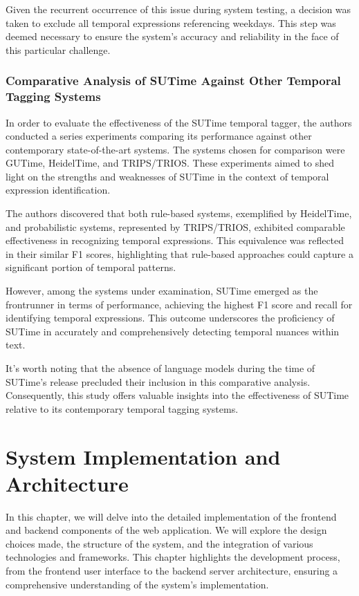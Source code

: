 \documentclass[a4paper,12pt]{report} %
\begin{document}
Given the recurrent occurrence of this issue during system testing, a decision was taken to exclude all temporal expressions referencing weekdays. This step was deemed necessary to ensure the system's accuracy and reliability in the face of this particular challenge.

\subsection{Comparative Analysis of SUTime Against Other Temporal Tagging Systems}
In order to evaluate the effectiveness of the SUTime temporal tagger, the authors conducted a series experiments comparing its performance against other contemporary state-of-the-art systems. The systems chosen for comparison were GUTime, HeidelTime, and TRIPS/TRIOS. These experiments aimed to shed light on the strengths and weaknesses of SUTime in the context of temporal expression identification.

The authors discovered that both rule-based systems, exemplified by HeidelTime, and probabilistic systems, represented by TRIPS/TRIOS, exhibited comparable effectiveness in recognizing temporal expressions. This equivalence was reflected in their similar F1 scores, highlighting that rule-based approaches could capture a significant portion of temporal patterns.

However, among the systems under examination, SUTime emerged as the frontrunner in terms of performance, achieving the highest F1 score and recall for identifying temporal expressions. This outcome underscores the proficiency of SUTime in accurately and comprehensively detecting temporal nuances within text.

It's worth noting that the absence of language models during the time of SUTime's release precluded their inclusion in this comparative analysis. Consequently, this study offers valuable insights into the effectiveness of SUTime relative to its contemporary temporal tagging systems.


\chapter{System Implementation and Architecture}
In this chapter, we will delve into the detailed implementation of the frontend and backend components of the web application. We will explore the design choices made, the structure of the system, and the integration of various technologies and frameworks. This chapter highlights the development process, from the frontend user interface to the backend server architecture, ensuring a comprehensive understanding of the system's implementation.
\end{document}
